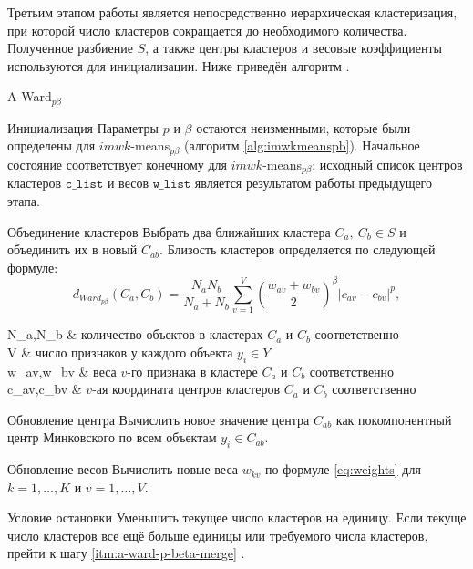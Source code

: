 \documentclass[12pt]{diploma}
\begin{document}
		Третьим этапом работы \AWardpb является непосредственно иерархическая кластеризация, при которой число кластеров сокращается до необходимого количества. Полученное разбиение $ S $, а также центры кластеров и весовые коэффициенты используются для инициализации. Ниже приведён алгоритм \AWardpb.
		
		\begin{algorithm}{A-Ward$ _{p\beta}$}{}
			\begin{astep}{Инициализация} 
				Параметры $ p $ и $ \beta $ остаются неизменными, которые были определены для \mbox{$ imwk$-means$_{p\beta} $} (алгоритм \ref{alg:imwkmeanspb}). Начальное состояние соответствует конечному для \mbox{$ imwk$-means$_{p\beta} $}: исходный список центров кластеров $ \mathtt{c\_list} $ и весов $ \mathtt{w\_list} $ является результатом работы предыдущего этапа.
			\end{astep}
			\begin{astep}{Объединение кластеров}\label{itm:a-ward-p-beta-merge} 
				Выбрать два ближайших кластера $ C_a,\:C_b \in S$ и объединить их в новый $ C_{ab} $. Близость кластеров определяется по следующей формуле: 
				\begin{equation} \label{eq:ward-p-beta-distance}
				d_{Ward_{p\beta}}(C_a,C_b)=\dfrac{N_aN_b}{N_a+N_b}\sum_{v=1}^{V}\left ( \frac{w_{av}+w_{bv}}{2} \right )^\beta |c_{av}-c_{bv}|^p,
				\end{equation}				
				\begin{conditions}
					N_a,\:N_b  & количество объектов в кластерах $ C_a $ и $ C_b $ соответственно \\
					V          &  число признаков у каждого объекта $ y_i \in Y $ \\
					w_{av},\:w_{bv}  & веса $ v $-го признака в кластере $ C_a $ и $ C_b $ соответственно \\
					c_{av},\:c_{bv} & $ v $-ая координата центров кластеров $ C_a $ и $ C_b $ соответственно 
				\end{conditions}
			\end{astep}
			\begin{astep}{Обновление центра} 
				Вычислить новое значение центра $ C_{ab} $ как покомпонентный центр Минковского по всем объектам $ y_i \in C_{ab} $.
			\end{astep}
			\begin{astep}{Обновление весов} 
				Вычислить новые веса $ w_{kv} $ по формуле \eqref{eq:weights} для $ k=1,\ldots,K $ и $ v=1,\ldots,V $.				
			\end{astep}
			\begin{astep}{Условие остановки} 
				Уменьшить текущее число кластеров на единицу. Если текуще число кластеров все ещё больше единицы или требуемого числа кластеров, прейти к шагу \ref{itm:a-ward-p-beta-merge} .
			\end{astep}
		\end{algorithm}
		
\end{document}
